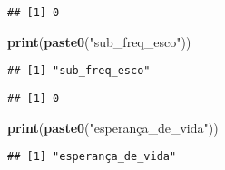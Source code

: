 \documentclass[
]{article}
\newenvironment{Shaded}{\begin{snugshade}}{\end{snugshade}}
\newcommand{\AttributeTok}[1]{\textcolor[rgb]{0.13,0.29,0.53}{#1}}
\newcommand{\DecValTok}[1]{\textcolor[rgb]{0.00,0.00,0.81}{#1}}
\newcommand{\FunctionTok}[1]{\textcolor[rgb]{0.13,0.29,0.53}{\textbf{#1}}}
\newcommand{\NormalTok}[1]{#1}
\newcommand{\OtherTok}[1]{\textcolor[rgb]{0.56,0.35,0.01}{#1}}
\newcommand{\SpecialCharTok}[1]{\textcolor[rgb]{0.81,0.36,0.00}{\textbf{#1}}}
\newcommand{\StringTok}[1]{\textcolor[rgb]{0.31,0.60,0.02}{#1}}
\begin{document}
\begin{verbatim}
## [1] 0
\end{verbatim}

\begin{Shaded}
\begin{Highlighting}[]
\FunctionTok{print}\NormalTok{(}\FunctionTok{paste0}\NormalTok{(}\StringTok{"sub\_freq\_esco"}\NormalTok{))}
\end{Highlighting}
\end{Shaded}

\begin{verbatim}
## [1] "sub_freq_esco"
\end{verbatim}

\begin{Shaded}
\end{Shaded}

\begin{verbatim}
## [1] 0
\end{verbatim}

\begin{Shaded}
\begin{Highlighting}[]
\FunctionTok{print}\NormalTok{(}\FunctionTok{paste0}\NormalTok{(}\StringTok{"esperança\_de\_vida"}\NormalTok{))}
\end{Highlighting}
\end{Shaded}

\begin{verbatim}
## [1] "esperança_de_vida"
\end{verbatim}
\end{document}
